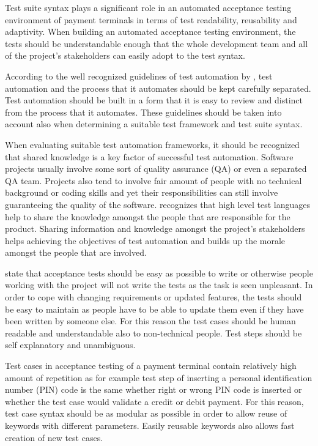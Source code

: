 Test suite syntax plays a significant role in an automated acceptance testing environment of payment terminals in terms of test readability, reusability and adaptivity. When building an automated acceptance testing environment, the tests should be understandable enough that the whole development team and all of the project's stakeholders can easily adopt to the test syntax.

According to the well recognized guidelines of test automation by \emph{\cite{snakeoil}}, test automation and the process that it automates should be kept carefully separated. Test automation should be built in a form that it is easy to review and distinct from the process that it automates. These guidelines should be taken into account also when determining a suitable test framework and test suite syntax.

When evaluating suitable test automation frameworks, it should be recognized that shared knowledge is a key factor of successful test automation. Software projects usually involve some sort of quality assurance (QA) or even a separated QA team. Projects also tend to involve fair amount of people with no technical background or coding skills and yet their responsibilities can still involve guaranteeing the quality of the software. \emph{\cite{just_enough}} recognizes that high level test languages help to share the knowledge amongst the people that are responsible for the product. Sharing information and knowledge amongst the project's stakeholders helps achieving the objectives of test automation and builds up the morale amongst the people that are involved.

\emph{\cite{lowell2003successful}} state that acceptance tests should be easy as possible to write or otherwise people working with the project will not write the tests as the task is seen unpleasant. In order to cope with changing requirements or updated features, the tests should be easy to maintain as people have to be able to update them even if they have been written by someone else. For this reason the test cases should be human readable and understandable also to non-technical people. Test steps should be self explanatory and unambiguous.

Test cases in acceptance testing of a payment terminal contain relatively high amount of repetition as for example test step of inserting a personal identification number (PIN) code is the same whether right or wrong PIN code is inserted or whether the test case would validate a credit or debit payment. For this reason, test case syntax should be as modular as possible in order to allow reuse of keywords with different parameters. Easily reusable keywords also allows fast creation of new test cases.

